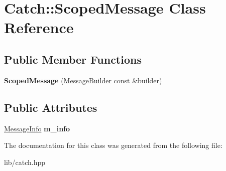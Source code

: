\hypertarget{class_catch_1_1_scoped_message}{}\section{Catch\+:\+:Scoped\+Message Class Reference}
\label{class_catch_1_1_scoped_message}
\subsection*{Public Member Functions}
\begin{DoxyCompactItemize}
\item 
\mbox{\label{class_catch_1_1_scoped_message_a5cc59f0f2ebe840e6607f83004d49a17}} 
{\bfseries Scoped\+Message} (\mbox{\hyperlink{struct_catch_1_1_message_builder}{Message\+Builder}} const \&builder)
\end{DoxyCompactItemize}
\subsection*{Public Attributes}
\begin{DoxyCompactItemize}
\item 
\mbox{\label{class_catch_1_1_scoped_message_ae6e1476f389cc6e1586f033b3747b27b}} 
\mbox{\hyperlink{struct_catch_1_1_message_info}{Message\+Info}} {\bfseries m\+\_\+info}
\end{DoxyCompactItemize}


The documentation for this class was generated from the following file\+:\begin{DoxyCompactItemize}
\item 
lib/catch.\+hpp\end{DoxyCompactItemize}
